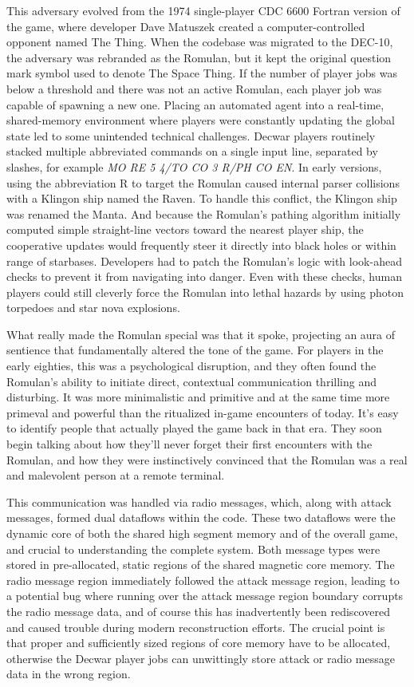 This adversary evolved from the 1974 single-player CDC 6600 Fortran version of the game, where developer Dave Matuszek created a computer-controlled opponent named The Thing. When the codebase was migrated to the DEC-10, the adversary was rebranded as the Romulan, but it kept the original question mark symbol used to denote The Space Thing. If the number of player jobs was below a threshold and there was not an active Romulan, each player job was capable of spawning a new one. Placing an automated agent into a real-time, shared-memory environment where players were constantly updating the global state led to some unintended technical challenges. Decwar players routinely stacked multiple abbreviated commands on a single input line, separated by slashes, for example \textit{MO RE 5 4/TO CO 3 R/PH CO EN}. In early versions, using the abbreviation R to target the Romulan caused internal parser collisions with a Klingon ship named the Raven. To handle this conflict, the Klingon ship was renamed the Manta. And because the Romulan's pathing algorithm initially computed simple straight-line vectors toward the nearest player ship, the cooperative updates would frequently steer it directly into black holes or within range of starbases. Developers had to patch the Romulan's logic with look-ahead checks to prevent it from navigating into danger. Even with these checks, human players could still cleverly force the Romulan into lethal hazards by using photon torpedoes and star nova explosions.

What really made the Romulan special was that it spoke, projecting an aura of sentience that fundamentally altered the tone of the game. For players in the early eighties, this was a psychological disruption, and they often found the Romulan’s ability to initiate direct, contextual communication thrilling and disturbing. It was more minimalistic and primitive and at the same time more primeval and powerful than the ritualized in-game encounters of today. It’s easy to identify people that actually played the game back in that era. They soon begin talking about how they’ll never forget their first encounters with the Romulan, and how they were instinctively convinced that the Romulan was a real and malevolent person at a remote terminal.

This communication was handled via radio messages, which, along with attack messages, formed dual dataflows within the code. These two dataflows were the dynamic core of both the shared high segment memory and of the overall game, and crucial to understanding the complete system. Both message types were stored in pre-allocated, static regions of the shared magnetic core memory. The radio message region immediately followed the attack message region, leading to a potential bug where running over the attack message region boundary corrupts the radio message data, and of course this has inadvertently been rediscovered and caused trouble during modern reconstruction efforts. The crucial point is that proper and sufficiently sized regions of core memory have to be allocated, otherwise the Decwar player jobs can unwittingly store attack or radio message data in the wrong region.

